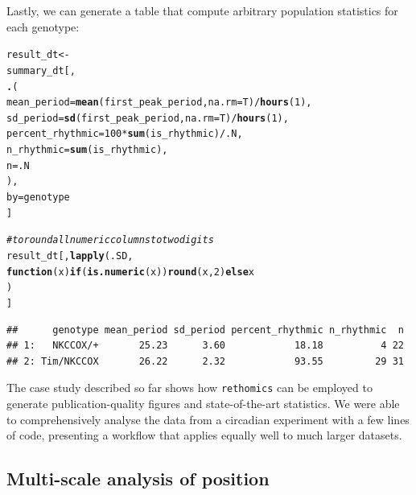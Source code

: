 \documentclass[10pt,letterpaper]{article}\usepackage[]{graphicx}\usepackage[]{color}
\makeatletter
\newcommand{\hlnum}[1]{\textcolor[rgb]{0.686,0.059,0.569}{#1}}%
\newcommand{\hlcom}[1]{\textcolor[rgb]{0.678,0.584,0.686}{\textit{#1}}}%
\newcommand{\hlopt}[1]{\textcolor[rgb]{0,0,0}{#1}}%
\newcommand{\hlstd}[1]{\textcolor[rgb]{0.345,0.345,0.345}{#1}}%
\newcommand{\hlkwa}[1]{\textcolor[rgb]{0.161,0.373,0.58}{\textbf{#1}}}%
\newcommand{\hlkwb}[1]{\textcolor[rgb]{0.69,0.353,0.396}{#1}}%
\newcommand{\hlkwc}[1]{\textcolor[rgb]{0.333,0.667,0.333}{#1}}%
\newcommand{\hlkwd}[1]{\textcolor[rgb]{0.737,0.353,0.396}{\textbf{#1}}}%
\newenvironment{kframe}{%
 \def\at@end@of@kframe{}%
 \ifinner\ifhmode%
  \def\at@end@of@kframe{\end{minipage}}%
  \begin{minipage}{\columnwidth}%
 \fi\fi%
 \def\FrameCommand##1{\hskip\@totalleftmargin \hskip-\fboxsep
 \colorbox{shadecolor}{##1}\hskip-\fboxsep
     \hskip-\linewidth \hskip-\@totalleftmargin \hskip\columnwidth}%
 \MakeFramed {\advance\hsize-\width
   \@totalleftmargin\z@ \linewidth\hsize
   \@setminipage}}%
 {\par\unskip\endMakeFramed%
 \at@end@of@kframe}
\newenvironment{knitrout}{}{} %
\makeatother
\begin{document}
Lastly, we can generate a table that compute arbitrary population statistics for each genotype:
\begin{knitrout}
\color{fgcolor}\begin{kframe}
\begin{alltt}
\hlstd{result_dt} \hlkwb{<-}
  \hlstd{summary_dt[,}
    \hlkwd{.}\hlstd{(}
       \hlkwc{mean_period} \hlstd{=} \hlkwd{mean}\hlstd{(first_peak_period,} \hlkwc{na.rm} \hlstd{= T)} \hlopt{/} \hlkwd{hours}\hlstd{(}\hlnum{1}\hlstd{),}
       \hlkwc{sd_period} \hlstd{=} \hlkwd{sd}\hlstd{(first_peak_period,} \hlkwc{na.rm} \hlstd{= T)} \hlopt{/} \hlkwd{hours}\hlstd{(}\hlnum{1}\hlstd{),}
       \hlkwc{percent_rhythmic} \hlstd{=} \hlnum{100} \hlopt{*} \hlkwd{sum}\hlstd{(is_rhythmic)} \hlopt{/} \hlstd{.N,}
       \hlkwc{n_rhythmic} \hlstd{=} \hlkwd{sum}\hlstd{(is_rhythmic),}
       \hlkwc{n} \hlstd{= .N}
     \hlstd{),}
    \hlkwc{by} \hlstd{= genotype}
  \hlstd{]}

\hlcom{# to round all numeric columns  to two digits}
\hlstd{result_dt[,} \hlkwd{lapply}\hlstd{(.SD,}
                   \hlkwa{function}\hlstd{(}\hlkwc{x}\hlstd{)} \hlkwa{if}\hlstd{(}\hlkwd{is.numeric}\hlstd{(x))} \hlkwd{round}\hlstd{(x,} \hlnum{2}\hlstd{)} \hlkwa{else} \hlstd{x}
                   \hlstd{)}
           \hlstd{]}
\end{alltt}
\begin{verbatim}
##      genotype mean_period sd_period percent_rhythmic n_rhythmic  n
## 1:   NKCCOX/+       25.23      3.60            18.18          4 22
## 2: Tim/NKCCOX       26.22      2.32            93.55         29 31
\end{verbatim}
\end{kframe}
\end{knitrout}



The case study described so far shows how \texttt{rethomics} can be employed to generate publication-quality figures and state-of-the-art statistics.
We were able to comprehensively analyse the data from a circadian experiment with a few lines of code,
presenting a workflow that applies equally well to much larger datasets.


\subsection*{Multi-scale analysis of position}
\end{document}
